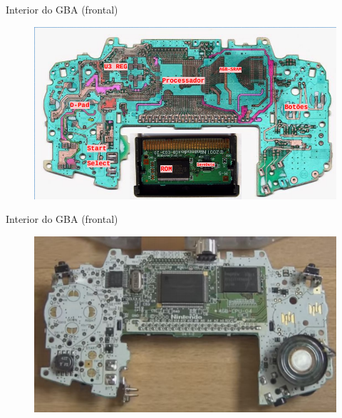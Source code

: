 \documentclass{beamer}
\begin{document}
\begin{darkframes}
    \begin{frame}{Interior do GBA (frontal)}
        \begin{figure}[h!]
            \centering
            \includegraphics[width=1\textwidth,height=1\textheight,keepaspectratio]{gba_inside_front}
        \end{figure}
    \end{frame}

    \begin{frame}{Interior do GBA (frontal)}
        \begin{figure}[h!]
            \centering
            \includegraphics[width=1\textwidth,height=1\textheight,keepaspectratio]{gba_inside_front_real}
        \end{figure}
    \end{frame}


\end{darkframes}
\end{document}

